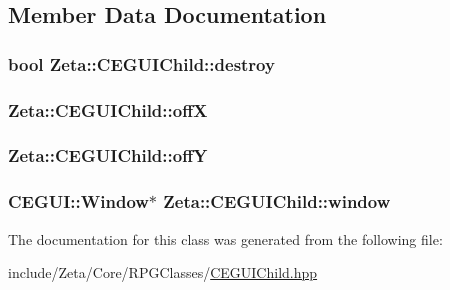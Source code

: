 \subsection{Member Data Documentation}
\hypertarget{classZeta_1_1CEGUIChild_a048b0e5733cbe3e069a3f1e7787aa3c9}{
\subsubsection[{destroy}]{\setlength{\rightskip}{0pt plus 5cm}bool Zeta\+::\+C\+E\+G\+U\+I\+Child\+::destroy\hspace{0.3cm}{\ttfamily [private]}}}\label{classZeta_1_1CEGUIChild_a048b0e5733cbe3e069a3f1e7787aa3c9}
\hypertarget{classZeta_1_1CEGUIChild_ab310788932185a4617ad278b5c2191d4}{
\subsubsection[{off\+X}]{ Zeta\+::\+C\+E\+G\+U\+I\+Child\+::off\+X\hspace{0.3cm}{\ttfamily [private]}}}\label{classZeta_1_1CEGUIChild_ab310788932185a4617ad278b5c2191d4}
\hypertarget{classZeta_1_1CEGUIChild_ad4f34c974859b029a4ccea381ba23fae}{
\subsubsection[{off\+Y}]{ Zeta\+::\+C\+E\+G\+U\+I\+Child\+::off\+Y\hspace{0.3cm}{\ttfamily [private]}}}\label{classZeta_1_1CEGUIChild_ad4f34c974859b029a4ccea381ba23fae}
\hypertarget{classZeta_1_1CEGUIChild_a613512ccdd6b324a8a15e063b6a56fdd}{
\subsubsection[{window}]{\setlength{\rightskip}{0pt plus 5cm}C\+E\+G\+U\+I\+::\+Window$\ast$ Zeta\+::\+C\+E\+G\+U\+I\+Child\+::window\hspace{0.3cm}{\ttfamily [private]}}}\label{classZeta_1_1CEGUIChild_a613512ccdd6b324a8a15e063b6a56fdd}


The documentation for this class was generated from the following file\+:\begin{DoxyCompactItemize}
\item 
include/\+Zeta/\+Core/\+R\+P\+G\+Classes/\hyperlink{CEGUIChild_8hpp}{C\+E\+G\+U\+I\+Child.\+hpp}\end{DoxyCompactItemize}
